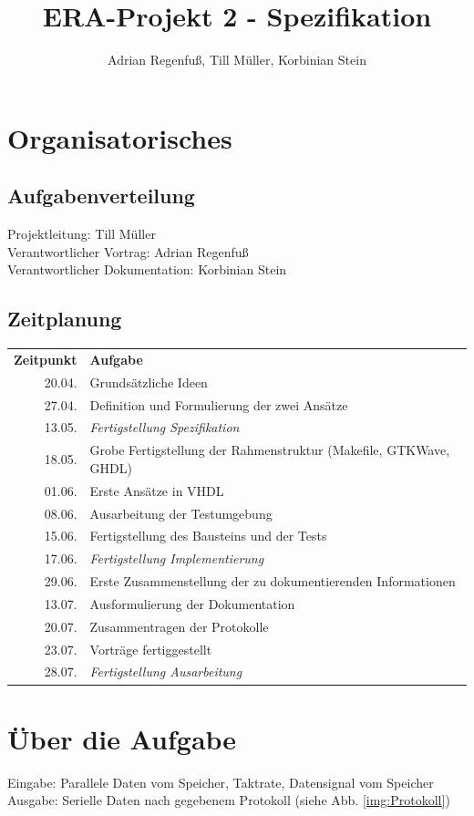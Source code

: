 \documentclass{article}
\title{ERA-Projekt 2 - Spezifikation}
\author{Adrian Regenfuß, Till Müller, Korbinian Stein}
\begin{document}
\maketitle
\section{Organisatorisches}
  \subsection{Aufgabenverteilung}
    Projektleitung: Till Müller\\
    Verantwortlicher Vortrag: Adrian Regenfuß\\
    Verantwortlicher Dokumentation: Korbinian Stein
  \subsection{Zeitplanung}

  	\begin{tabular}{r | l}
  		\textbf{Zeitpunkt}&\textbf{Aufgabe}\\
  		20.04.&Grundsätzliche Ideen\\
  		27.04.&Definition und Formulierung der zwei Ansätze\\
  		13.05.&\emph{Fertigstellung Spezifikation}\\
  		18.05.&Grobe Fertigstellung der Rahmenstruktur (Makefile, GTKWave, GHDL)\\
  		01.06.&Erste Ansätze in VHDL\\
  		08.06.&Ausarbeitung der Testumgebung\\
  		15.06.&Fertigstellung des Bausteins und der Tests\\
  		17.06.&\emph{Fertigstellung Implementierung}\\
  		29.06.&Erste Zusammenstellung der zu dokumentierenden Informationen\\
  		13.07.&Ausformulierung der Dokumentation\\
  		20.07.&Zusammentragen der Protokolle\\
  		23.07.&Vorträge fertiggestellt\\
  		28.07.&\emph{Fertigstellung Ausarbeitung}\\
  	\end{tabular}

\section{Über die Aufgabe}
  Eingabe: Parallele Daten vom Speicher, Taktrate, Datensignal vom Speicher\\
  Ausgabe: Serielle Daten nach gegebenem Protokoll (siehe Abb. \ref{img:Protokoll})
\end{document}
